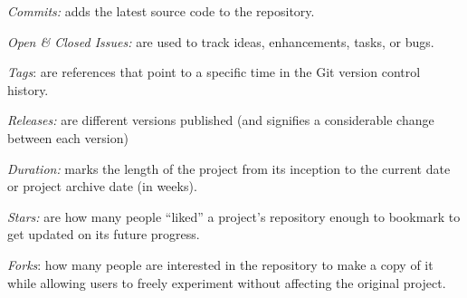 \documentclass[conference,10pt]{IEEEtran}
\begin{document}
  

\item \textit{Commits:} adds the latest source code to the repository.

\item  \textit{Open \& Closed Issues:} are used to track ideas, enhancements, tasks, or bugs.


\item  \textit{Tags}: are references that point to a specific time in the Git version control history. 


\item  \textit{Releases:} are different versions published (and  signifies a considerable  change between each version)

\item \textit{Duration:} marks the length of the project from its inception to the current date or project archive date (in weeks).
\item \textit{Stars:} are how many people
  ``liked'' a project's repository enough to bookmark to get updated on its future progress.
  
\item   \textit{Forks}: how many people are interested in the repository to make a copy of it while  allowing users to freely experiment without affecting the original project.
   
  
\end{document}
